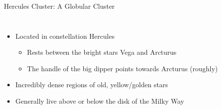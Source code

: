 \documentclass[pdf, ]{beamer}
\begin{document}
\begin{frame}{Hercules Cluster: A Globular Cluster}
	\begin{columns}
		\begin{itemize}
			\item Located in constellation Hercules
				\begin{itemize}
					\item Rests between the bright stars Vega and Arcturus
					\item The handle of the big dipper points towards Arcturus (roughly)
				\end{itemize}
			\item Incredibly dense regions of old, yellow/golden stars
			\item Generally live above or below the disk of the Milky Way
		\end{itemize}
		
		\begin{center}
\end{center}
\end{columns}
\end{frame}
\end{document}
